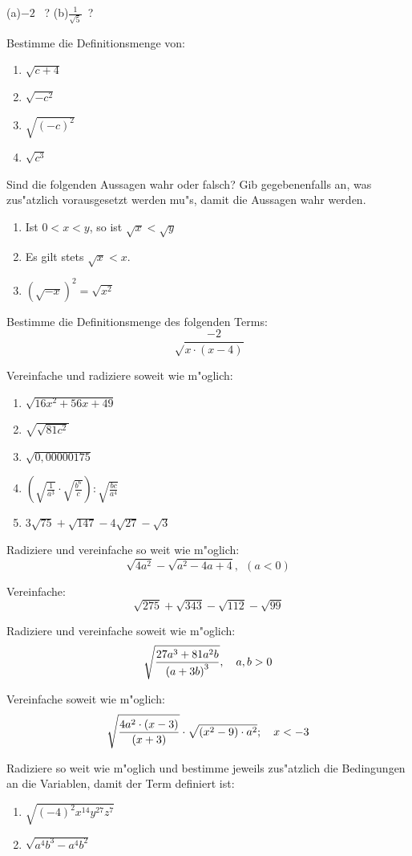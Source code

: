 \documentclass[a4paper, twoside, parskip, 10pt, smallheadings]{scrbook}
\theoremstyle{plain}
\theoremstyle{definition}
\begin{document}
(a)\qquad $-2$~ ?\hspace{2cm} (b)\qquad $ \frac{1}{\sqrt{5}}$~? 
\item
 Bestimme die Definitionsmenge von:
\begin{enumerate}
\item
$\sqrt{c + 4}$
\item
$\sqrt{-c^2}$
\item
$\sqrt{(- c)^2}$
\item
$\sqrt{c^3}$
\end{enumerate}
\item
Sind die folgenden Aussagen wahr oder falsch? Gib gegebenenfalls an, was zus"atzlich vorausgesetzt
werden mu"s, damit die Aussagen wahr werden.
\begin{enumerate}
\item
Ist $0 < x < y $, so ist $\sqrt{x} < \sqrt{y}$
\item
Es gilt stets $\sqrt{x} < x$.
\item
$\left( \sqrt{-x}\right)^2 = \sqrt{x^2}$
\end{enumerate}
\item
Bestimme die Definitionsmenge des folgenden Terms:
\[\sqrt \frac{-2}{x\cdot(x-4)}\]
\item
 Vereinfache und radiziere soweit wie m"oglich:
\begin{enumerate}
\item
$\sqrt{16 x^2 + 56 x + 49}$
\item
$\sqrt{\sqrt{81c^2}}$
\item
$\sqrt{0,00000175}$
\item
$\left(\sqrt{\frac{  1}{  a^3}} \cdot \sqrt{\frac{  b^6}{  c}} \right) : \sqrt{\frac{  bc}{ 
a^4}}$
\item
$3\sqrt{75} + \sqrt{147} - 4 \sqrt{27} - \sqrt{3}$
\end{enumerate}
\item
Radiziere und vereinfache so weit wie m"oglich:
$$
\sqrt{4a^2} - \sqrt{a^2-4a+4}, \ \ (a<0)
$$
\item
Vereinfache:
$$
\sqrt{275} + \sqrt{343} - \sqrt{112} - \sqrt{99}
$$
\item
Radiziere und vereinfache soweit wie m"oglich:
$$
\sqrt{27a^3+81a^2b \over {(a+3b)}^3},\quad a,b>0
$$
\item
 Vereinfache soweit wie m"oglich:
$$
\sqrt{4a^2\cdot(x-3) \over (x+3)} \cdot \sqrt{(x^2-9)\cdot a^2}; \quad x<-3
$$
\item
Radiziere so weit wie m"oglich und bestimme jeweils zus"atzlich die Bedingungen an die Variablen,
damit der Term definiert ist:
\begin{enumerate}
\item   $\sqrt{(-4)^2x^{14}y^{27}z^{7}}$
\item   $\sqrt{a^4b^3-a^4b^2}$
\end{enumerate}
\end{document}
